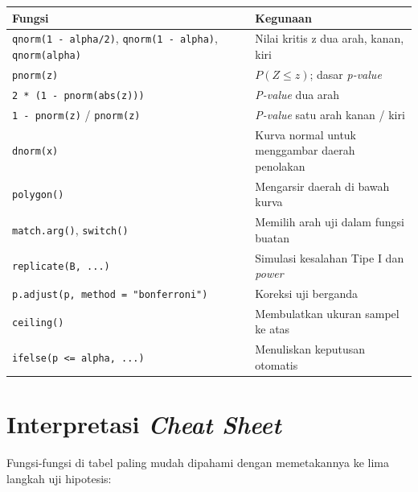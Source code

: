\documentclass[
  indonesian,
  letterpaper,
]{book}
\newcounter{none} %
\begin{document}
{\def\LTcaptype{none} %
\begin{longtable}[]{@{}
  >{\raggedright\arraybackslash}p{}
  >{\raggedright\arraybackslash}p{}@{}}
\toprule\noalign{}
\begin{minipage}[b]{\linewidth}\raggedright
Fungsi
\end{minipage} & \begin{minipage}[b]{\linewidth}\raggedright
Kegunaan
\end{minipage} \\
\midrule\noalign{}
\endhead
\bottomrule\noalign{}
\endlastfoot
\texttt{qnorm(1\ -\ alpha/2)}, \texttt{qnorm(1\ -\ alpha)},
\texttt{qnorm(alpha)} & Nilai kritis z dua arah, kanan, kiri \\
\texttt{pnorm(z)} & \(P(Z \le z)\); dasar \emph{p-value} \\
\texttt{2\ *\ (1\ -\ pnorm(abs(z)))} & \emph{P-value} dua arah \\
\texttt{1\ -\ pnorm(z)} / \texttt{pnorm(z)} & \emph{P-value} satu arah
kanan / kiri \\
\texttt{dnorm(x)} & Kurva normal untuk menggambar daerah penolakan \\
\texttt{polygon()} & Mengarsir daerah di bawah kurva \\
\texttt{match.arg()}, \texttt{switch()} & Memilih arah uji dalam fungsi
buatan \\
\texttt{replicate(B,\ ...)} & Simulasi kesalahan Tipe I dan
\emph{power} \\
\texttt{p.adjust(p,\ method\ =\ "bonferroni")} & Koreksi uji berganda \\
\texttt{ceiling()} & Membulatkan ukuran sampel ke atas \\
\texttt{ifelse(p\ \textless{}=\ alpha,\ ...)} & Menuliskan keputusan
otomatis \\
\end{longtable}
}

\section{\texorpdfstring{Interpretasi \emph{Cheat
Sheet}}{Interpretasi Cheat Sheet}}\label{interpretasi-cheat-sheet}

Fungsi-fungsi di tabel paling mudah dipahami dengan memetakannya ke lima
langkah uji hipotesis:
\end{document}
